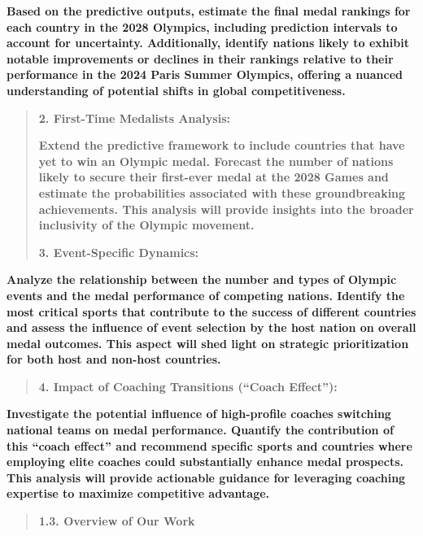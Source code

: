 \documentclass[12pt,a4paper]{article}
\renewenvironment{quote}{\begin{quotation}}{\end{quotation}}  %
\begin{document}
    \textbf{Based on the predictive outputs, estimate the final medal
    rankings for each country in the 2028 Olympics, including prediction
    intervals to account for uncertainty. Additionally, identify nations
    likely to exhibit notable improvements or declines in their rankings
    relative to their performance in the 2024 Paris Summer Olympics,
    offering a nuanced understanding of potential shifts in global
    competitiveness.}
    
    \begin{quote}
    \textbf{2. First-Time Medalists Analysis:}
    
    \textbf{Extend the predictive framework to include countries that have
    yet to win an Olympic medal. Forecast the number of nations likely to
    secure their first-ever medal at the 2028 Games and estimate the
    probabilities associated with these groundbreaking achievements. This
    analysis will provide insights into the broader inclusivity of the
    Olympic movement.}
    
    \textbf{3. Event-Specific Dynamics:}
    \end{quote}
    
    \textbf{Analyze the relationship between the number and types of Olympic
    events and the medal performance of competing nations. Identify the most
    critical sports that contribute to the success of different countries
    and assess the influence of event selection by the host nation on
    overall medal outcomes. This aspect will shed light on strategic
    prioritization for both host and non-host countries.}
    
    \begin{quote}
    \textbf{4. Impact of Coaching Transitions (``Coach Effect''):}
    \end{quote}
    
    \textbf{Investigate the potential influence of high-profile coaches
    switching national teams on medal performance. Quantify the contribution
    of this ``coach effect'' and recommend specific sports and countries
    where employing elite coaches could substantially enhance medal
    prospects. This analysis will provide actionable guidance for leveraging
    coaching expertise to maximize competitive advantage.}
    
    \begin{quote}
    \protect{}\label{bookmark5-1}{}\textbf{1.3. Overview of Our
    Work}
    \end{quote}
    
\end{document}
